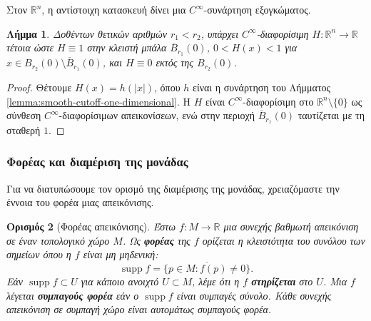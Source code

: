 \documentclass[11pt,a4paper,twoside,openright]{book}
\newtheorem{lemma}{Λήμμα}[section]
\newtheorem{definition}[lemma]{Ορισμός}
\begin{document}
\noindent
Στον $\mathbb{R}^n$, η αντίστοιχη κατασκευή δίνει μια $C^\infty$-συνάρτηση εξογκώματος.

\begin{lemma}\label{lemma:smooth-bump-function-euclidean}
Δοθέντων θετικών αριθμών $r_1 < r_2$, υπάρχει $C^\infty$-διαφορίσιμη $H: \mathbb{R}^n \to \mathbb{R}$ τέτοια ώστε $H \equiv 1$ στην κλειστή μπάλα $\overline{B}_{r_1}(0)$, $0 < H(x) < 1$ για $x \in B_{r_2}(0) \setminus \overline{B}_{r_1}(0)$, και $H \equiv 0$ εκτός της $B_{r_2}(0)$.
\end{lemma}

\begin{proof}
Θέτουμε $H(x) = h(|x|)$, όπου $h$ είναι η συνάρτηση του Λήμματος \ref{lemma:smooth-cutoff-one-dimensional}. Η $H$ είναι $C^\infty$-διαφορίσιμη στο $\mathbb{R}^n \setminus \{0\}$ ως σύνθεση $C^\infty$-διαφορίσιμων απεικονίσεων, ενώ στην περιοχή $\overline{B}_{r_1}(0)$ ταυτίζεται με τη σταθερή $1$.
\end{proof}

\subsubsection{Φορέας και διαμέριση της μονάδας}
	\label{sec:support-and-partition-of-unity}

Για να διατυπώσουμε τον ορισμό της διαμέρισης της μονάδας, χρειαζόμαστε την έννοια του φορέα μιας απεικόνισης.

\begin{definition}[Φορέας απεικόνισης]\label{def:support}
Έστω $f: M \to \mathbb{R}$ μια συνεχής βαθμωτή απεικόνιση σε έναν τοπολογικό χώρο $M$. Ως \textbf{φορέας} της $f$ ορίζεται η κλειστότητα του συνόλου των σημείων όπου η $f$ είναι μη μηδενική:
\begin{equation*}
\operatorname{supp} f = \overline{\{ p \in M : f(p) \neq 0 \}}.
\end{equation*}
Εάν $\operatorname{supp} f \subset U$ για κάποιο ανοιχτό $U \subset M$, λέμε ότι η $f$ \textbf{στηρίζεται} στο $U$. Μια $f$ λέγεται \textbf{συμπαγούς φορέα} εάν ο $\operatorname{supp} f$ είναι συμπαγές σύνολο. Κάθε συνεχής απεικόνιση σε συμπαγή χώρο είναι αυτομάτως συμπαγούς φορέα.
\end{definition}
\end{document}
